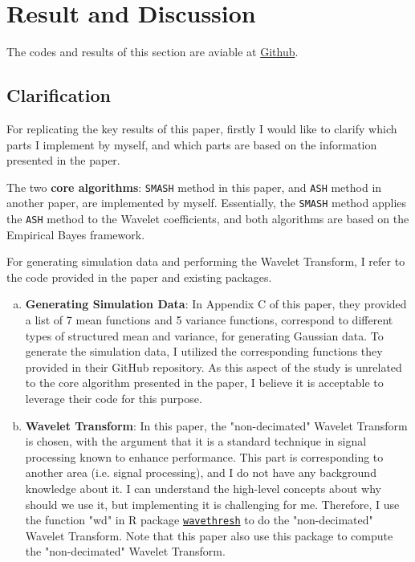 \documentclass[11pt]{article}
\begin{document}



\section{Result and Discussion}

The codes and results of this section are aviable at \href{https://github.com/Hrzzzzz/MATH5472_Final_Project/tree/main}{Github}.

\subsection{Clarification}

For replicating the key results of this paper, firstly I would like to clarify which parts I implement by myself, and which parts are based on the information presented in the paper.

The two \textbf{core algorithms}: \verb|SMASH| method \cite{Xing} in this paper, and \verb|ASH| method \cite{Stephens} in another paper, are implemented by myself. Essentially, the \verb|SMASH| method applies the \verb|ASH| method to the Wavelet coefficients, and both algorithms are based on the Empirical Bayes framework.

For generating simulation data and performing the Wavelet Transform, I refer to the code provided in the paper and existing packages. 
\begin{enumerate}[a)]
\item \textbf{Generating Simulation Data}: In Appendix C of this paper, they provided a list of 7 mean functions and 5 variance functions, correspond to different types of structured mean and variance, for generating Gaussian data. To generate the simulation data, I utilized the corresponding functions they provided in their GitHub repository. As this aspect of the study is unrelated to the core algorithm presented in the paper, I believe it is acceptable to leverage their code for this purpose.
\item \textbf{Wavelet Transform}: In this paper, the "non-decimated" Wavelet Transform is chosen, with the argument that it is a standard technique in signal processing known to enhance performance. This part is corresponding to another area (i.e. signal processing), and I do not have any background knowledge about it. I can understand the high-level concepts about why should we use it, but implementing it is challenging for me. Therefore, I use the function "wd" in R package \href{https://cran.r-project.org/web/packages/wavethresh/wavethresh.pdf}{\texttt{wavethresh}} to do the "non-decimated" Wavelet Transform. Note that this paper also use this package to compute the "non-decimated" Wavelet Transform.
\end{enumerate} 
\end{document}
